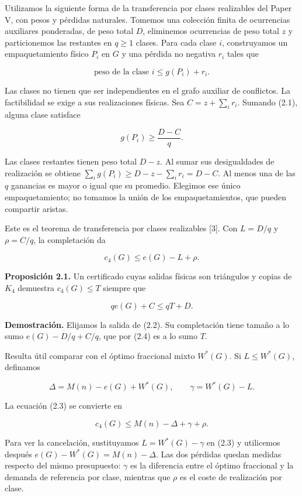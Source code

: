 \documentclass[spanish,11pt,a4paper]{article}
\begin{document}
Utilizamos la siguiente forma de la transferencia por clases realizables
del Paper V, con pesos y pérdidas naturales. Tomemos una colección
finita de ocurrencias auxiliares ponderadas, de peso total \(D\),
eliminemos ocurrencias de peso total \(z\) y particionemos las restantes
en \(q\ge1\) clases. Para cada clase \(i\), construyamos un
empaquetamiento físico \(P_i\) en \(G\) y una pérdida no negativa
\(r_i\) tales que

\[
\text{peso de la clase }i\le g(P_i)+r_i.
\tag{2.1}
\]

Las clases no tienen que ser independientes en el grafo auxiliar de
conflictos. La factibilidad se exige a sus realizaciones físicas. Sea
\(C=z+\sum_i r_i\). Sumando (2.1), alguna clase satisface

\[
g(P_i)\ge\frac{D-C}{q}.
\tag{2.2}
\]

Las clases restantes tienen peso total \(D-z\). Al sumar sus
desigualdades de realización se obtiene
\(\sum_i g(P_i)\ge D-z-\sum_i r_i=D-C\). Al menos una de las \(q\)
ganancias es mayor o igual que su promedio. Elegimos ese único
empaquetamiento; no tomamos la unión de los empaquetamientos, que pueden
compartir aristas.

Este es el teorema de transferencia por clases realizables {[}3{]}. Con
\(L=D/q\) y \(\rho=C/q\), la completación da

\[
c_4(G)\le e(G)-L+\rho.
\tag{2.3}
\]

\textbf{Proposición 2.1.} Un certificado cuyas salidas físicas son
triángulos y copias de \(K_4\) demuestra \(c_4(G)\le T\) siempre que

\[
qe(G)+C\le qT+D.
\tag{2.4}
\]

\textbf{Demostración.} Elijamos la salida de (2.2). Su completación
tiene tamaño a lo sumo \(e(G)-D/q+C/q\), que por (2.4) es a lo sumo
\(T\).

Resulta útil comparar con el óptimo fraccional mixto \(W^*(G)\). Si
\(L\le W^*(G)\), definamos

\[
\Delta=M(n)-e(G)+W^*(G),\qquad
\gamma=W^*(G)-L.
\]

La ecuación (2.3) se convierte en

\[
c_4(G)\le M(n)-\Delta+\gamma+\rho.
\tag{2.5}
\]

Para ver la cancelación, sustituyamos \(L=W^*(G)-\gamma\) en (2.3) y
utilicemos después \(e(G)-W^*(G)=M(n)-\Delta\). Las dos pérdidas quedan
medidas respecto del mismo presupuesto: \(\gamma\) es la diferencia
entre el óptimo fraccional y la demanda de referencia por clase,
mientras que \(\rho\) es el coste de realización por clase.
\end{document}
